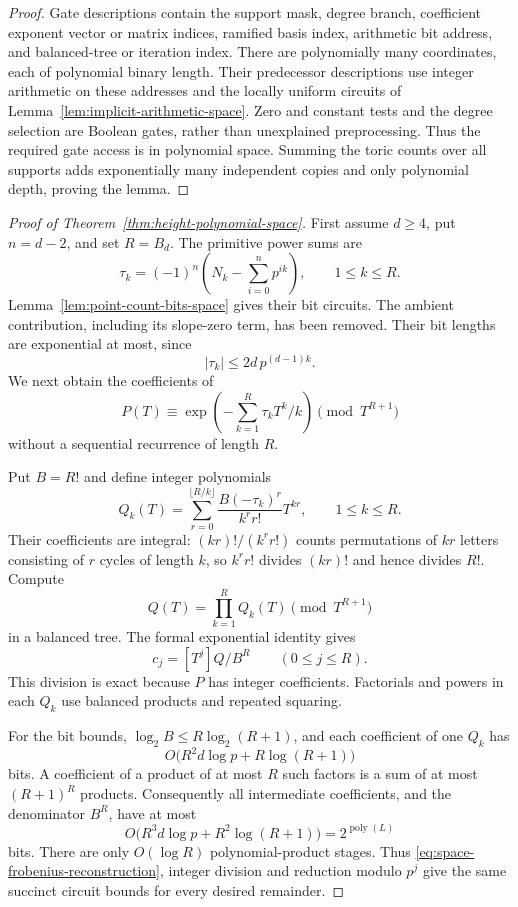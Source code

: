 \begin{proof}
Gate descriptions contain the support mask, degree branch, coefficient exponent vector or matrix indices, ramified basis index, arithmetic bit address, and balanced-tree or iteration index. There are polynomially many coordinates, each of polynomial binary length. Their predecessor descriptions use integer arithmetic on these addresses and the locally uniform circuits of Lemma~\ref{lem:implicit-arithmetic-space}. Zero and constant tests and the degree selection are Boolean gates, rather than unexplained preprocessing. Thus the required gate access is in polynomial space. Summing the toric counts over all supports adds exponentially many independent copies and only polynomial depth, proving the lemma.
\end{proof}

\begin{proof}[Proof of Theorem~\ref{thm:height-polynomial-space}]
First assume $d\ge4$, put $n=d-2$, and set $R=B_d$. The primitive power sums are
\[
 \tau_k=(-1)^n\left(N_k-\sum_{i=0}^{n}p^{ik}\right),
 \qquad 1\le k\le R.
\]
Lemma~\ref{lem:point-count-bits-space} gives their bit circuits. The ambient contribution, including its slope-zero term, has been removed. Their bit lengths are exponential at most, since
\[
 |\tau_k|\le 2d\,p^{(d-1)k}.
\]
We next obtain the coefficients of
\[
 P(T)\equiv\exp\left(-\sum_{k=1}^{R}\tau_kT^k/k\right)
                  \pmod{T^{R+1}}
\]
without a sequential recurrence of length $R$.

Put $B=R!$ and define integer polynomials
\[
 Q_k(T)=\sum_{r=0}^{\lfloor R/k\rfloor}
        \frac{B(-\tau_k)^r}{k^r r!}T^{kr},
 \qquad 1\le k\le R.
\]
Their coefficients are integral: $(kr)!/(k^rr!)$ counts permutations of $kr$ letters consisting of $r$ cycles of length $k$, so $k^rr!$ divides $(kr)!$ and hence divides $R!$. Compute
\[
 Q(T)=\prod_{k=1}^{R}Q_k(T)\pmod{T^{R+1}}
\]
in a balanced tree. The formal exponential identity gives
\begin{equation}\label{eq:space-frobenius-reconstruction}
 c_j=[T^j]Q/B^R\qquad(0\le j\le R).
\end{equation}
This division is exact because $P$ has integer coefficients. Factorials and powers in each $Q_k$ use balanced products and repeated squaring.

For the bit bounds, $\log_2B\le R\log_2(R+1)$, and each coefficient of one $Q_k$ has
\[
 O\bigl(R^2d\log p+R\log(R+1)\bigr)
\]
bits. A coefficient of a product of at most $R$ such factors is a sum of at most $(R+1)^R$ products. Consequently all intermediate coefficients, and the denominator $B^R$, have at most
\[
 O\bigl(R^3d\log p+R^2\log(R+1)\bigr)=2^{\operatorname{poly}(L)}
\]
bits. There are only $O(\log R)$ polynomial-product stages. Thus \eqref{eq:space-frobenius-reconstruction}, integer division and reduction modulo $p^j$ give the same succinct circuit bounds for every desired remainder.


\end{proof}
